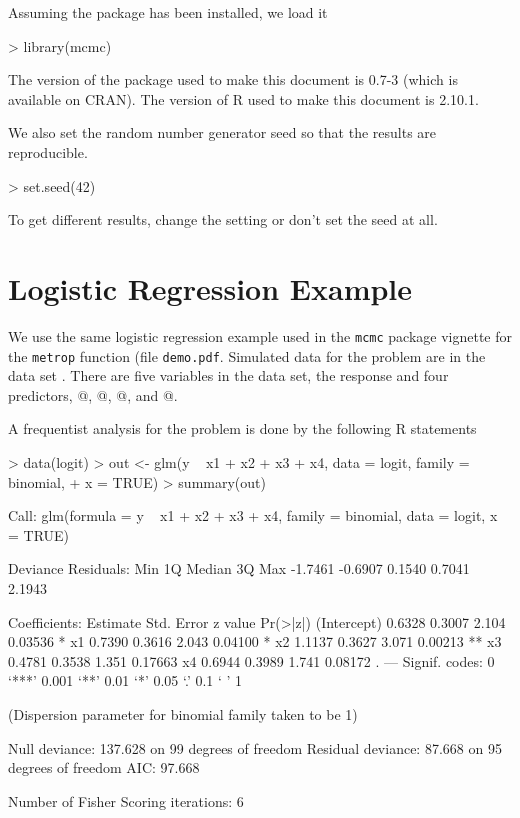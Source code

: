 \documentclass[11pt]{article}
\begin{document}
Assuming the \verb@mcmc@ package has been installed, we load it
\begin{Schunk}
\begin{Sinput}
> library(mcmc)
\end{Sinput}
\end{Schunk}
The version of the package used to make this document
is 0.7-3 (which is available on CRAN).
The version of R used to make this document is 2.10.1.

We also set the random number generator seed so that the results are
reproducible.
\begin{Schunk}
\begin{Sinput}
> set.seed(42)
\end{Sinput}
\end{Schunk}
To get different results, change the setting or don't set the seed at all.

\section{Logistic Regression Example}

We use the same logistic regression example used in the \texttt{mcmc}
package vignette for the \texttt{metrop} function (file \texttt{demo.pdf}.
Simulated data for the problem are in the data set \verb@logit@.
There are five variables in the data set, the response \verb@y@
and four predictors, @, @, @, and @.

A frequentist analysis for the problem is done by the following R statements
\begin{Schunk}
\begin{Sinput}
> data(logit)
> out <- glm(y ~ x1 + x2 + x3 + x4, data = logit, family = binomial, 
+     x = TRUE)
> summary(out)
\end{Sinput}
\begin{Soutput}
Call:
glm(formula = y ~ x1 + x2 + x3 + x4, family = binomial, data = logit, 
    x = TRUE)

Deviance Residuals: 
    Min       1Q   Median       3Q      Max  
-1.7461  -0.6907   0.1540   0.7041   2.1943  

Coefficients:
            Estimate Std. Error z value Pr(>|z|)   
(Intercept)   0.6328     0.3007   2.104  0.03536 * 
x1            0.7390     0.3616   2.043  0.04100 * 
x2            1.1137     0.3627   3.071  0.00213 **
x3            0.4781     0.3538   1.351  0.17663   
x4            0.6944     0.3989   1.741  0.08172 . 
---
Signif. codes:  0 ‘***’ 0.001 ‘**’ 0.01 ‘*’ 0.05 ‘.’ 0.1 ‘ ’ 1 

(Dispersion parameter for binomial family taken to be 1)

    Null deviance: 137.628  on 99  degrees of freedom
Residual deviance:  87.668  on 95  degrees of freedom
AIC: 97.668

Number of Fisher Scoring iterations: 6
\end{Soutput}
\end{Schunk}
\end{document}
